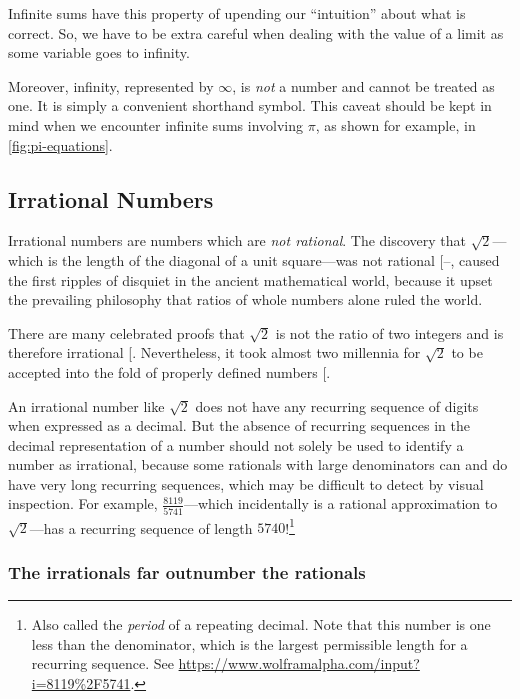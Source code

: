 \documentclass[
  a4paper,
]{article}
\begin{document}
Infinite sums have this property of upending our ``intuition'' about
what is correct. So, we have to be extra careful when dealing with the
value of a limit as some variable goes to infinity.

Moreover, infinity, represented by \(\infty\), is \emph{not} a number
and cannot be treated as one. It is simply a convenient shorthand
symbol. This caveat should be kept in mind when we encounter infinite
sums involving \(\pi\), as shown for example, in
\cref{fig:pi-equations}.

\subsection{Irrational Numbers}\label{irrational-numbers}

Irrational numbers are numbers which are \emph{not rational}. The
discovery that \(\sqrt{2}\)---which is the length of the diagonal of a
unit square---was not rational
{[}--\citeproc{ref-havil-irrationals-2012}{4}{]},
caused the first ripples of disquiet in the ancient mathematical world,
because it upset the prevailing philosophy that ratios of whole numbers
alone ruled the world.

There are many celebrated proofs that \(\sqrt{2}\) is not the ratio of
two integers and is therefore irrational
{[}\citeproc{ref-bogomolny2018}{5}{]}. Nevertheless, it took almost two
millennia for \(\sqrt{2}\) to be accepted into the fold of properly
defined numbers {[}\citeproc{ref-cepelewicz2024}{6}{]}.

An irrational number like \(\sqrt{2}\) does not have any recurring
sequence of digits when expressed as a decimal. But the absence of
recurring sequences in the decimal representation of a number should not
solely be used to identify a number as irrational, because some
rationals with large denominators can and do have very long recurring
sequences, which may be difficult to detect by visual inspection. For
example, \(\frac{8119}{5741}\)---which incidentally is a rational
approximation to \(\sqrt{2}\)---has a recurring sequence of length
\(5740\)!\footnote{Also called the \emph{period} of a repeating decimal.
  Note that this number is one less than the denominator, which is the
  largest permissible length for a recurring sequence. See
  \url{https://www.wolframalpha.com/input?i=8119\%2F5741}.}

\subsubsection{The irrationals far outnumber the
rationals}\label{the-irrationals-far-outnumber-the-rationals}
\end{document}
